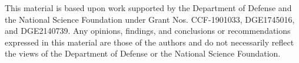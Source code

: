 This material is based upon work supported by the Department of Defense and the National Science Foundation under Grant Nos. CCF-1901033, DGE1745016, and DGE2140739. Any opinions, findings, and conclusions or recommendations expressed in this material are those of the authors and do not necessarily reflect the views of the Department of Defense or the National Science Foundation.
